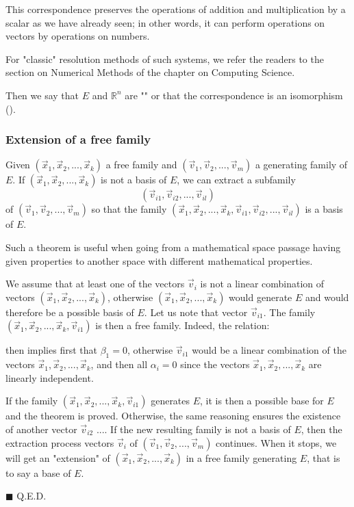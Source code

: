 	This correspondence preserves the operations of addition and multiplication by a scalar as we have already seen; in other words, it can perform operations on vectors by operations on numbers.
	
	\begin{tcolorbox}[title=Remark,colframe=black,arc=10pt]
For "classic" resolution methods of such systems, we refer the readers to the section on Numerical Methods of the chapter on Computing Science.
	\end{tcolorbox}	
	Then we say that $E$ and $\mathbb{R}^n$ are "" or that the correspondence is an isomorphism ().
	
	\subsubsection{Extension of a free family}
	\begin{theorem}
	Given $(\vec{x}_1,\vec{x}_2,...,\vec{x}_k)$ a free family and $(\vec{v}_1,\vec{v}_2,...,\vec{v}_m)$ a generating family of $E$. If $(\vec{x}_1,\vec{x}_2,...,\vec{x}_k)$ is not a basis of $E$, we can extract a subfamily $$(\vec{v}_{i1},\vec{v}_{i2},...,\vec{v}_{il})$$ of $(\vec{v}_1,\vec{v}_2,...,\vec{v}_m)$ so that the family $(\vec{x}_1,\vec{x}_2,...,\vec{x}_k,\vec{v}_{i1},\vec{v}_{i2},...,\vec{v}_{il})$ is a basis of $E$.
	\end{theorem}
	\begin{tcolorbox}[title=Remark,colframe=black,arc=10pt]
	Such a theorem is useful when going from a mathematical space passage having given properties to another space with different mathematical properties.
	\end{tcolorbox}	
	\begin{dem}
	We assume that at least one of the vectors $\vec{v}_i$ is not a linear combination of vectors $(\vec{x}_1,\vec{x}_2,...,\vec{x}_k)$, otherwise $(\vec{x}_1,\vec{x}_2,...,\vec{x}_k)$ would generate $E$ and would therefore be a possible basis of $E$. Let us note that vector $\vec{v}_{i1}$. The family $(\vec{x}_1,\vec{x}_2,...,\vec{x}_k,\vec{v}_{i1})$ is then a free family. Indeed, the relation:
	
	then implies first that $\beta_1=0$, otherwise $\vec{v}_{i1}$ would be a linear combination of the vectors $\vec{x}_1,\vec{x}_2,...,\vec{x}_k$, and then all $\alpha_i=0$ since the vectors $\vec{x}_1,\vec{x}_2,...,\vec{x}_k$ are linearly independent.
	
	If the family $(\vec{x}_1,\vec{x}_2,...,\vec{x}_k,\vec{v}_{i1})$ generates $E$, it is then a possible base for $E$ and the theorem is proved. Otherwise, the same reasoning ensures the existence of another vector $\vec{v}_{i2}$ .... If the new resulting family is not a basis of $E$, then the extraction process vectors $\vec{v}_i$ of $(\vec{v}_1,\vec{v}_2,...,\vec{v}_m)$ continues. When it stops, we will get an "extension" of $(\vec{x}_1,\vec{x}_2,...,\vec{x}_k)$ in a free family generating $E$, that is to say a base of $E$.
	\begin{flushright}
		$\blacksquare$  Q.E.D.
	\end{flushright}
	\end{dem}
